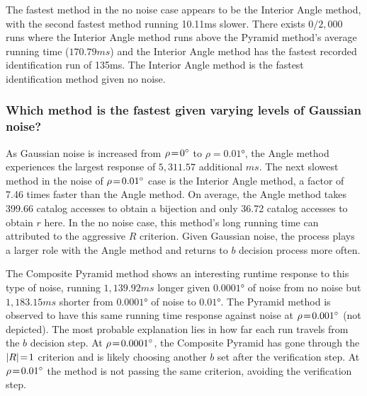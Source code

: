\documentclass[conference]{IEEEtran}
\begin{document}
    The fastest method in the no noise case appears to be the Interior Angle method, with the second fastest method running
    10.11\si{ms} slower.
    There exists $0 / 2{,}000$ runs where the Interior Angle method runs above the Pyramid method's average running time
    ($170.79\si{ms}$) and the Interior Angle method has the fastest recorded identification run of 135ms.
    The Interior Angle method is the fastest identification method given no noise.

    \subsubsection{Which method is the fastest given varying levels of Gaussian noise?}
    As Gaussian noise is increased from $\rho\!=\!\ang{0}$ to $\rho=\ang{0.01}$, the Angle method experiences the largest
    response of $5{,}311.57$ additional $\si{ms}$.
    The next slowest method in the noise of $\rho\!=\!\ang{0.01}$ case is the Interior Angle method, a factor of 7.46 times
    faster than the Angle method.
    On average, the Angle method takes 399.66 catalog accesses to obtain a bijection and only 36.72 catalog accesses
    to obtain $r$ here.
    In the no noise case, this method's long running time can attributed to the aggressive $R$ criterion.
    Given Gaussian noise, the  process plays a larger role with the Angle method and returns to $b$
    decision process more often.

    The Composite Pyramid method shows an interesting runtime response to this type of noise, running $1{,}139.92\si{ms}$
    longer given $\ang{0.0001}$ of noise from no noise but $1{,}183.15\si{ms}$ shorter from $\ang{0.0001}$ of noise to
    $\ang{0.01}$.
    The Pyramid method is observed to have this same running time response against noise at $\rho\!=\!\ang{0.001}$
    (not depicted).
    The most probable explanation lies in how far each run travels from the $b$ decision step.
    At $\rho\!=\!\ang{0.0001}$, the Composite Pyramid has gone through the $\left| R \right| \!=\! 1$ criterion and is likely choosing
    another $b$ set after the verification step.
    At $\rho\!=\!\ang{0.01}$ the method is not passing the same criterion, avoiding the verification step.
\end{document}
